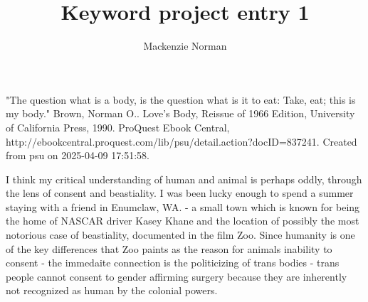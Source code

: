 \documentclass{article}
\title{Keyword project entry 1}
\author{Mackenzie Norman}
\begin{document}
"The question what is a body, is the question what is it to eat: Take, eat; this is my body."
Brown, Norman O.. Love's Body, Reissue of 1966 Edition, University of California Press, 1990. ProQuest Ebook Central, http://ebookcentral.proquest.com/lib/psu/detail.action?docID=837241.
Created from psu on 2025-04-09 17:51:58.

I think my critical understanding of human and animal is perhaps oddly, through the lens of consent and beastiality. I was been lucky enough to spend a summer staying with a friend in Enumclaw, WA. - a small town which is known for being the home of NASCAR driver Kasey Khane and the location of possibly the most notorious case of beastiality, documented in the film Zoo. Since humanity is one of the key differences that Zoo paints as the reason for animals inability to consent - the immedaite connection is the politicizing of trans bodies - trans people cannot consent to gender affirming surgery because they are inherently not recognized as human by the colonial powers.  
\end{document}
